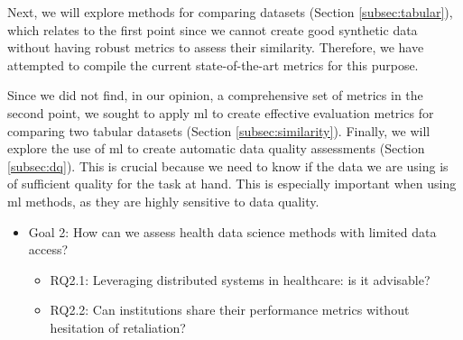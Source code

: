 Next, we will explore methods for comparing datasets (Section \ref{subsec:tabular}), which relates to the first point since we cannot create good synthetic data without having robust metrics to assess their similarity. Therefore, we have attempted to compile the current state-of-the-art metrics for this purpose.

Since we did not find, in our opinion, a comprehensive set of metrics in the second point, we sought to apply \ac{ml} to create effective evaluation metrics for comparing two tabular datasets (Section \ref{subsec:similarity}). Finally, we will explore the use of \ac{ml} to create automatic data quality assessments (Section \ref{subsec:dq}). This is crucial because we need to know if the data we are using is of sufficient quality for the task at hand. This is especially important when using \ac{ml} methods, as they are highly sensitive to data quality.



\begin{itemize}

    \item Goal 2: How can we assess health data science methods with limited data access?
    \begin{itemize}
        \item RQ2.1: Leveraging distributed systems in healthcare: is it advisable?
        \item RQ2.2: Can institutions share their performance metrics without hesitation of retaliation?
    \end{itemize}
\end{itemize}

